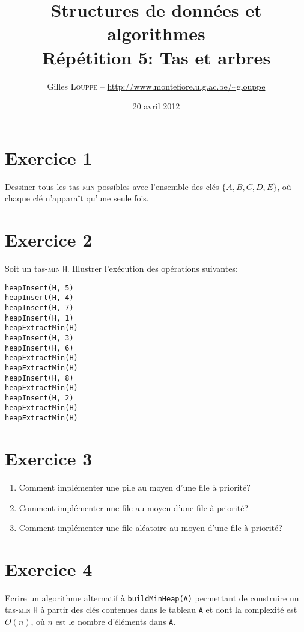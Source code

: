 \documentclass[a4paper,10pt]{article}
\title{
    \textbf{Structures de données et algorithmes}\\
    Répétition 5: Tas et arbres
}
\author{Gilles \textsc{Louppe} -- \url{http://www.montefiore.ulg.ac.be/~glouppe}}
\date{20 avril 2012}
\begin{document}
\maketitle

\section*{Exercice 1}

Dessiner tous les tas-\textsc{min} possibles avec l'ensemble des clés $\{A, B, C, D, E\}$, où chaque clé n'apparaît qu'une seule fois.

\section*{Exercice 2}

Soit un tas-\textsc{min} \texttt{H}. Illustrer l'exécution des opérations suivantes:

\begin{verbatim}
heapInsert(H, 5)
heapInsert(H, 4)
heapInsert(H, 7)
heapInsert(H, 1)
heapExtractMin(H)
heapInsert(H, 3)
heapInsert(H, 6)
heapExtractMin(H)
heapExtractMin(H)
heapInsert(H, 8)
heapExtractMin(H)
heapInsert(H, 2)
heapExtractMin(H)
heapExtractMin(H)
\end{verbatim}

\section*{Exercice 3}

\begin{enumerate}

\item Comment implémenter une pile au moyen d'une file à priorité?

\item Comment implémenter une file au moyen d'une file à priorité?

\item Comment implémenter une file aléatoire au moyen d'une file à priorité?

\end{enumerate}

\section*{Exercice 4}

Ecrire un algorithme alternatif à \texttt{buildMinHeap(A)} permettant de construire un tas-\textsc{min} \texttt{H} à partir des clés contenues dans le tableau \texttt{A} et dont la complexité est $O(n)$, où $n$ est le nombre d'éléments dans \texttt{A}.
\end{document}
